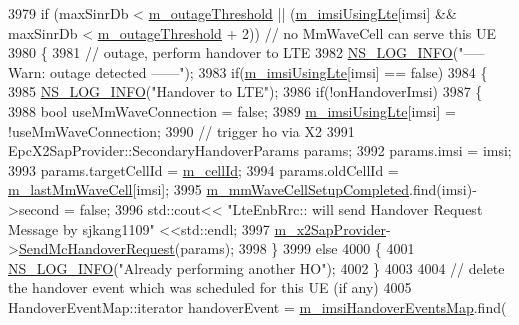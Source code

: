 \begin{DoxyCode}
3979       \textcolor{keywordflow}{if} (maxSinrDb < \hyperlink{classns3_1_1LteEnbRrc_adf505b71799b8dbd81372695f14a0716}{m\_outageThreshold} || (\hyperlink{classns3_1_1LteEnbRrc_a99427e888b10d095491e72bf062511db}{m\_imsiUsingLte}[imsi] && 
      maxSinrDb < \hyperlink{classns3_1_1LteEnbRrc_adf505b71799b8dbd81372695f14a0716}{m\_outageThreshold} + 2)) \textcolor{comment}{// no MmWaveCell can serve this UE}
3980       \{
3981         \textcolor{comment}{// outage, perform handover to LTE}
3982         \hyperlink{group__logging_gafbd73ee2cf9f26b319f49086d8e860fb}{NS\_LOG\_INFO}(\textcolor{stringliteral}{"----- Warn: outage detected ------"});
3983         \textcolor{keywordflow}{if}(\hyperlink{classns3_1_1LteEnbRrc_a99427e888b10d095491e72bf062511db}{m\_imsiUsingLte}[imsi] == \textcolor{keyword}{false}) 
3984         \{
3985           \hyperlink{group__logging_gafbd73ee2cf9f26b319f49086d8e860fb}{NS\_LOG\_INFO}(\textcolor{stringliteral}{"Handover to LTE"});
3986           \textcolor{keywordflow}{if}(!onHandoverImsi)
3987           \{
3988             \textcolor{keywordtype}{bool} useMmWaveConnection = \textcolor{keyword}{false};
3989             \hyperlink{classns3_1_1LteEnbRrc_a99427e888b10d095491e72bf062511db}{m\_imsiUsingLte}[imsi] = !useMmWaveConnection;
3990             \textcolor{comment}{// trigger ho via X2}
3991             EpcX2SapProvider::SecondaryHandoverParams params;
3992             params.imsi = imsi;
3993             params.targetCellId = \hyperlink{classns3_1_1LteEnbRrc_a4ced331e168e6c1aeca0bb11be19b8c7}{m\_cellId};
3994             params.oldCellId = \hyperlink{classns3_1_1LteEnbRrc_a0d7b04f0383b0dc3f6a7360b87cbaeee}{m\_lastMmWaveCell}[imsi];
3995             \hyperlink{classns3_1_1LteEnbRrc_ad19d6f4c123115e1d13e34609781ab20}{m\_mmWaveCellSetupCompleted}.find(imsi)->second = \textcolor{keyword}{false};
3996             std::cout<< \textcolor{stringliteral}{"LteEnbRrc:: will send Handover Request Message by sjkang1109"} <<std::endl;
3997             \hyperlink{classns3_1_1LteEnbRrc_ae8dc75f4f6f63b7736d86204a4beb415}{m\_x2SapProvider}->\hyperlink{classns3_1_1EpcX2SapProvider_a419d10f3f7f1808938a53439bed4f9eb}{SendMcHandoverRequest}(params);
3998           \}
3999           \textcolor{keywordflow}{else}
4000           \{
4001             \hyperlink{group__logging_gafbd73ee2cf9f26b319f49086d8e860fb}{NS\_LOG\_INFO}(\textcolor{stringliteral}{"Already performing another HO"});
4002           \}
4003 
4004           \textcolor{comment}{// delete the handover event which was scheduled for this UE (if any)}
4005           HandoverEventMap::iterator handoverEvent = \hyperlink{classns3_1_1LteEnbRrc_a6f703158e9a4ceaccbd1c5df7f5b0ba1}{m\_imsiHandoverEventsMap}.find(

\end{DoxyCode}
